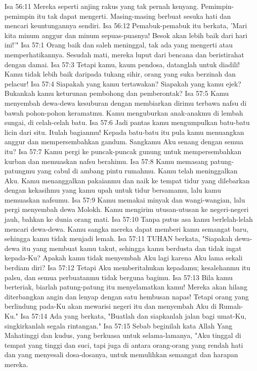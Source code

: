 Isa 56:11  Mereka seperti anjing rakus yang tak pernah kenyang. Pemimpin-pemimpin itu tak dapat mengerti. Masing-masing berbuat sesuka hati dan mencari keuntungannya sendiri.
Isa 56:12  Pemabuk-pemabuk itu berkata, 'Mari kita minum anggur dan minum sepuas-puasnya! Besok akan lebih baik dari hari ini!'"
Isa 57:1  Orang baik dan saleh meninggal, tak ada yang mengerti atau memperhatikannya. Sesudah mati, mereka luput dari bencana dan beristirahat dengan damai.
Isa 57:3  Tetapi kamu, kaum pendosa, datanglah untuk diadili! Kamu tidak lebih baik daripada tukang sihir, orang yang suka berzinah dan pelacur!
Isa 57:4  Siapakah yang kamu tertawakan? Siapakah yang kamu ejek? Bukankah kamu keturunan pembohong dan pemberontak?
Isa 57:5  Kamu menyembah dewa-dewa kesuburan dengan membiarkan dirimu terbawa nafsu di bawah pohon-pohon keramatmu. Kamu menguburkan anak-anakmu di lembah sungai, di celah-celah batu.
Isa 57:6  Jadi pantas kamu mengumpulkan batu-batu licin dari situ. Itulah bagianmu! Kepada batu-batu itu pula kamu menuangkan anggur dan mempersembahkan gandum. Sangkamu Aku senang dengan semua itu?
Isa 57:7  Kamu pergi ke puncak-puncak gunung untuk mempersembahkan kurban dan memuaskan nafsu berahimu.
Isa 57:8  Kamu memasang patung-patungmu yang cabul di ambang pintu rumahmu. Kamu telah meninggalkan Aku. Kamu menanggalkan pakaianmu dan naik ke tempat tidur yang dilebarkan dengan kekasihmu yang kamu upah untuk tidur bersamamu, lalu kamu memuaskan nafsumu.
Isa 57:9  Kamu memakai minyak dan wangi-wangian, lalu pergi menyembah dewa Molokh. Kamu mengirim utusan-utusan ke negeri-negeri jauh, bahkan ke dunia orang mati.
Isa 57:10  Tanpa putus asa kamu berlelah-lelah mencari dewa-dewa. Kamu sangka mereka dapat memberi kamu semangat baru, sehingga kamu tidak menjadi lemah.
Isa 57:11  TUHAN berkata, "Siapakah dewa-dewa itu yang membuat kamu takut, sehingga kamu berdusta dan tidak ingat kepada-Ku? Apakah kamu tidak menyembah Aku lagi karena Aku lama sekali berdiam diri?
Isa 57:12  Tetapi Aku memberitahukan kepadamu; kesalehanmu itu palsu, dan semua perbuatanmu tidak berguna bagimu.
Isa 57:13  Bila kamu berteriak, biarlah patung-patung itu menyelamatkan kamu! Mereka akan hilang diterbangkan angin dan lenyap dengan satu hembusan napas! Tetapi orang yang berlindung pada-Ku akan mewarisi negeri itu dan menyembah Aku di Rumah-Ku."
Isa 57:14  Ada yang berkata, "Buatlah dan siapkanlah jalan bagi umat-Ku, singkirkanlah segala rintangan."
Isa 57:15  Sebab beginilah kata Allah Yang Mahatinggi dan kudus, yang berkuasa untuk selama-lamanya, "Aku tinggal di tempat yang tinggi dan suci, tapi juga di antara orang-orang yang rendah hati dan yang menyesali dosa-dosanya, untuk memulihkan semangat dan harapan mereka.
